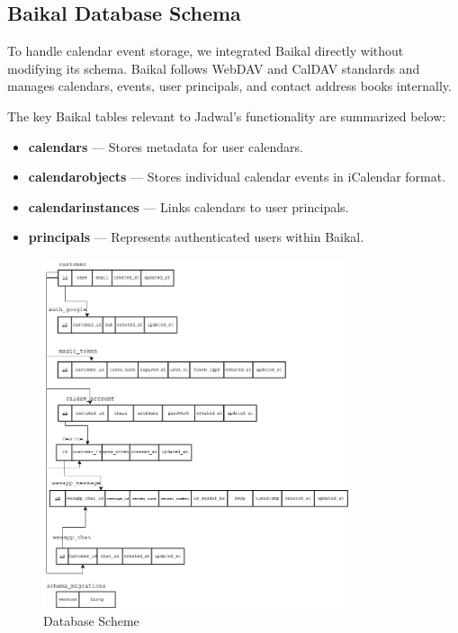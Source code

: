 \subsection{Baikal Database Schema}



To handle calendar event storage, we integrated Baikal directly without modifying its schema. Baikal follows WebDAV and CalDAV standards and manages calendars, events, user principals, and contact address books internally.

The key Baikal tables relevant to Jadwal's functionality are summarized below:

\begin{itemize}
    \item \textbf{calendars} — Stores metadata for user calendars.
    \item \textbf{calendarobjects} — Stores individual calendar events in iCalendar format.
    \item \textbf{calendarinstances} — Links calendars to user principals.
    \item \textbf{principals} — Represents authenticated users within Baikal.
\end{itemize}

\begin{figure}[H]
    \centering
    \includegraphics[width=0.8\textwidth]{images/GPrelation.drawio (1).png}
    \caption{Database Scheme}
    \label{fig:architecture-realization}
\end{figure}

